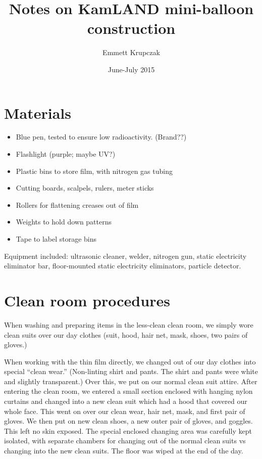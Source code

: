 \documentclass{article}
\title{Notes on KamLAND mini-balloon construction}
\date{June-July 2015}
\author{Emmett Krupczak}
\begin{document}
\maketitle


\section{Materials}
\begin{itemize}
\item Blue pen, tested to ensure low radioactivity. (Brand??)
\item Flashlight (purple; maybe UV?)
\item Plastic bins to store film, with nitrogen gas tubing
\item Cutting boards, scalpels, rulers, meter sticks
\item Rollers for flattening creases out of film
\item Weights to hold down patterns
\item Tape to label storage bins
\end{itemize}
Equipment included: ultrasonic cleaner, welder, nitrogen gun, static electricity eliminator bar, floor-mounted static electricity eliminators, particle detector. 

\section{Clean room procedures}
When washing and preparing items in the less-clean clean room, we simply wore clean suits over our day clothes (suit, hood, hair net, mask, shoes, two pairs of gloves.) 

When working with the thin film directly, we changed out of our day clothes into special ``clean wear.'' (Non-linting shirt and pants. The shirt and pants were white and slightly transparent.) Over this, we put on our normal clean suit attire. After entering the clean room, we entered a small section enclosed with hanging nylon curtains and changed into a new clean suit which had a hood that covered our whole face. This went on over our clean wear, hair net, mask, and first pair of gloves. We then put on new clean shoes, a new outer pair of gloves, and goggles. This left no skin exposed. 
The special enclosed changing area was carefully kept isolated, with separate chambers for changing out of the normal clean suits vs changing into the new clean suits. The floor was wiped at the end of the day. 
\end{document}

